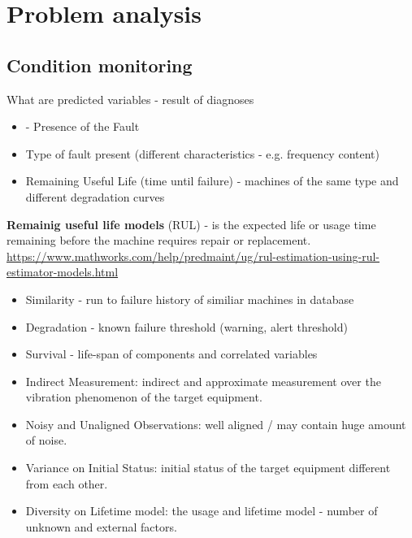 \chapter{Problem analysis}


\section{Condition monitoring}

What are predicted variables - result of diagnoses
\begin{itemize}
\item - Presence of the Fault
\item Type of fault present (different characteristics - e.g. frequency content)
\item Remaining Useful Life (time until failure) - machines of the same type and different degradation curves
\end{itemize}

\textbf{Remainig useful life models} (RUL) - is the expected life or usage time remaining before the machine requires repair or replacement.
\url{https://www.mathworks.com/help/predmaint/ug/rul-estimation-using-rul-estimator-models.html}
\begin{itemize}
\item Similarity - run to failure history of similiar machines in database
\item Degradation - known failure threshold (warning, alert threshold)
\item Survival  - life-span of components and correlated variables
\end{itemize}


\cite{jung_vibration_2017}
\begin{itemize}
\item Indirect Measurement: indirect and approximate measurement over the vibration phenomenon of the target equipment.
\item Noisy and Unaligned Observations: well aligned / may contain huge amount of noise.
\item Variance on Initial Status: initial status of the target equipment different from each other.
\item Diversity on Lifetime model: the usage and lifetime model -  number of unknown and external factors.
\end{itemize}

